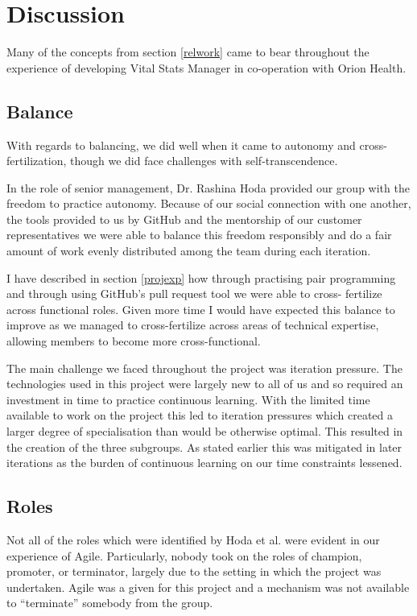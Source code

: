 \documentclass[conference]{IEEEtran}
\begin{document}
\section{Discussion}

Many of the concepts from section \ref{relwork} came to bear throughout the
experience of developing Vital Stats Manager in co-operation with Orion Health.

\subsection{Balance}

With regards to balancing, we did well when it came to autonomy and cross-
fertilization, though we did face challenges with self-transcendence.

In the role of senior management, Dr. Rashina Hoda provided our group with the
freedom to practice autonomy. Because of our social connection with one another,
the tools provided to us by GitHub and the mentorship of our customer
representatives we were able to balance this freedom responsibly and do a fair
amount of work evenly distributed among the team during each iteration.

I have described in section \ref{projexp} how through practising pair
programming and through using GitHub's pull request tool we were able to cross-
fertilize across functional roles. Given more time I would have expected this
balance to improve as we managed to cross-fertilize across areas of technical
expertise, allowing members to become more cross-functional.

The main challenge we faced throughout the project was iteration pressure. The
technologies used in this project were largely new to all of us and so required
an investment in time to practice continuous learning. With the limited time
available to work on the project this led to iteration pressures which created a
larger degree of specialisation than would be otherwise optimal. This resulted
in the creation of the three subgroups. As stated earlier this was mitigated in
later iterations as the burden of continuous learning on our time constraints
lessened.

\subsection{Roles}

Not all of the roles which were identified by Hoda et al.
\cite{hoda2010organizing} were evident in our experience of Agile. Particularly,
nobody took on the roles of champion, promoter, or terminator, largely due to
the setting in which the project was undertaken. Agile was a given for this
project and a mechanism was not available to ``terminate'' somebody from the
group.
\end{document}
